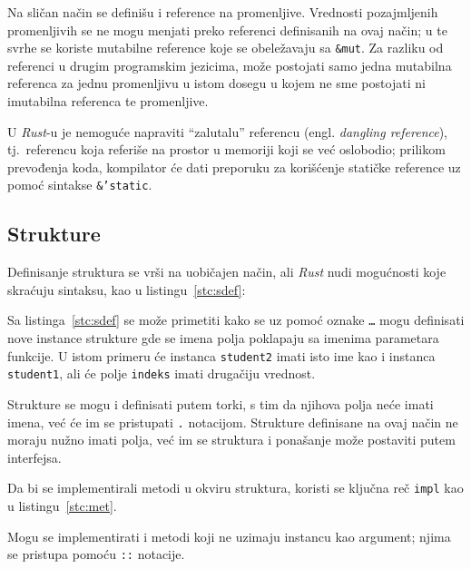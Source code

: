 \documentclass[12pt,oneside]{memoir}
\begin{document}


Na sličan način se definišu i reference na promenljive. Vrednosti pozajmljenih promenljivih se ne
mogu menjati preko referenci definisanih na ovaj način; u te svrhe
se koriste mutabilne reference koje se obeležavaju sa \texttt{\&mut}. Za razliku od referenci
u drugim programskim jezicima, može postojati samo jedna mutabilna referenca za jednu
promenljivu u istom dosegu u kojem ne sme postojati ni imutabilna referenca te promenljive.

U \emph{Rust}-u je nemoguće napraviti ``zalutalu'' referencu (engl. \emph{dangling reference}),
tj.\ referencu koja referiše na prostor u memoriji koji se već oslobodio; prilikom prevođenja
koda, kompilator će dati preporuku za korišćenje statičke reference uz pomoć sintakse
\texttt{\&'static}.

\subsection{Strukture}
Definisanje struktura se vrši na uobičajen način, ali \emph{Rust} nudi mogućnosti koje skraćuju
sintaksu, kao u listingu~\ref{stc:sdef}:



Sa listinga~\ref{stc:sdef} se može primetiti kako se uz pomoć oznake \texttt{\ldots} mogu definisati
nove instance strukture gde se imena
polja poklapaju sa imenima parametara funkcije. U istom primeru će instanca \texttt{student2}
imati isto ime kao i instanca \texttt{student1}, ali će polje \texttt{indeks} imati
drugačiju vrednost.

Strukture se mogu i definisati putem torki, s tim da njihova polja neće imati imena, već će
im se pristupati \texttt{.} notacijom. Strukture definisane na ovaj način ne moraju nužno imati
polja, već im se struktura i ponašanje može postaviti putem interfejsa.

Da bi se implementirali metodi u okviru struktura, koristi se ključna reč \texttt{impl} kao u
listingu~\ref{stc:met}.



Mogu se implementirati i metodi koji ne uzimaju instancu kao argument; njima se pristupa pomoću
\texttt{::} notacije.
\end{document}

